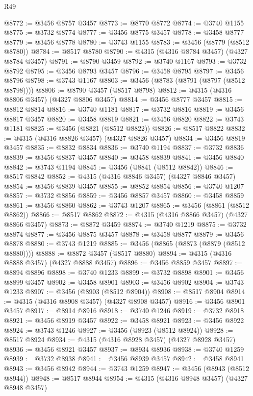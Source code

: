 \begin{lexlean}{R49}
\begin{coremodule}
@8772 := @3456 @8757 @3457
@8773 := @8770 @8772
@8774 := @3740 @1155
@8775 := @3732 @8774
@8777 := @3456 @8775 @3457
@8778 := @3458 @8777
@8779 := @3456 @8778
@8780 := @3743 @1155
@8783 := @3456 (@8779 (@8512 @8780))
@8784 := @8517 @8780
@8790 := @4315 (@4316 @8784 @3457) (@4327 @8784 @3457)
@8791 := @8790 @3459
@8792 := @3740 @1167
@8793 := @3732 @8792
@8795 := @3456 @8793 @3457
@8796 := @3458 @8795
@8797 := @3456 @8796
@8798 := @3743 @1167
@8803 := @3456 (@8783 (@8791 (@8797 (@8512 @8798))))
@8806 := @8790 @3457 (@8517 @8798)
@8812 := @4315 (@4316 @8806 @3457) (@4327 @8806 @3457)
@8814 := @3456 @8777 @3457
@8815 := @8812 @8814
@8816 := @3740 @1181
@8817 := @3732 @8816
@8819 := @3456 @8817 @3457
@8820 := @3458 @8819
@8821 := @3456 @8820
@8822 := @3743 @1181
@8825 := @3456 (@8821 (@8512 @8822))
@8826 := @8517 @8822
@8832 := @4315 (@4316 @8826 @3457) (@4327 @8826 @3457)
@8834 := @3456 @8819 @3457
@8835 := @8832 @8834
@8836 := @3740 @1194
@8837 := @3732 @8836
@8839 := @3456 @8837 @3457
@8840 := @3458 @8839
@8841 := @3456 @8840
@8842 := @3743 @1194
@8845 := @3456 (@8841 (@8512 @8842))
@8846 := @8517 @8842
@8852 := @4315 (@4316 @8846 @3457) (@4327 @8846 @3457)
@8854 := @3456 @8839 @3457
@8855 := @8852 @8854
@8856 := @3740 @1207
@8857 := @3732 @8856
@8859 := @3456 @8857 @3457
@8860 := @3458 @8859
@8861 := @3456 @8860
@8862 := @3743 @1207
@8865 := @3456 (@8861 (@8512 @8862))
@8866 := @8517 @8862
@8872 := @4315 (@4316 @8866 @3457) (@4327 @8866 @3457)
@8873 := @8872 @3459
@8874 := @3740 @1219
@8875 := @3732 @8874
@8877 := @3456 @8875 @3457
@8878 := @3458 @8877
@8879 := @3456 @8878
@8880 := @3743 @1219
@8885 := @3456 (@8865 (@8873 (@8879 (@8512 @8880))))
@8888 := @8872 @3457 (@8517 @8880)
@8894 := @4315 (@4316 @8888 @3457) (@4327 @8888 @3457)
@8896 := @3456 @8859 @3457
@8897 := @8894 @8896
@8898 := @3740 @1233
@8899 := @3732 @8898
@8901 := @3456 @8899 @3457
@8902 := @3458 @8901
@8903 := @3456 @8902
@8904 := @3743 @1233
@8907 := @3456 (@8903 (@8512 @8904))
@8908 := @8517 @8904
@8914 := @4315 (@4316 @8908 @3457) (@4327 @8908 @3457)
@8916 := @3456 @8901 @3457
@8917 := @8914 @8916
@8918 := @3740 @1246
@8919 := @3732 @8918
@8921 := @3456 @8919 @3457
@8922 := @3458 @8921
@8923 := @3456 @8922
@8924 := @3743 @1246
@8927 := @3456 (@8923 (@8512 @8924))
@8928 := @8517 @8924
@8934 := @4315 (@4316 @8928 @3457) (@4327 @8928 @3457)
@8936 := @3456 @8921 @3457
@8937 := @8934 @8936
@8938 := @3740 @1259
@8939 := @3732 @8938
@8941 := @3456 @8939 @3457
@8942 := @3458 @8941
@8943 := @3456 @8942
@8944 := @3743 @1259
@8947 := @3456 (@8943 (@8512 @8944))
@8948 := @8517 @8944
@8954 := @4315 (@4316 @8948 @3457) (@4327 @8948 @3457)

\end{coremodule}
\end{lexlean}
